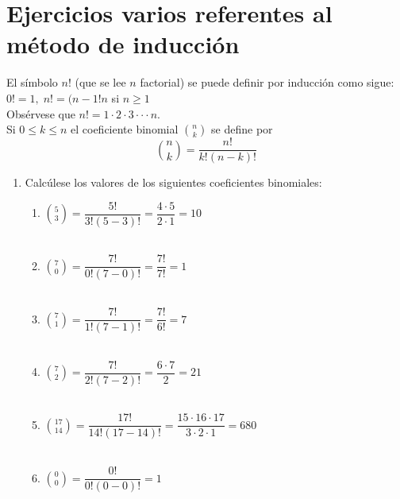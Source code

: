 \section{Ejercicios varios referentes al método de inducción}
\begin{def.}
El símbolo $n!$ (que se lee $n$ factorial) se puede definir por inducción como sigue: $0!=1, \; n!=(n-1!n$ si $n\geq 1$\\
Obsérvese que $n!=1\cdot 2 \cdot 3 \cdot \cdot \cdot n.$\\
Si $0\leq k \leq n$ el coeficiente binomial ${n \choose k}$ se define por 
$${n \choose k} = \dfrac{n!}{k!(n-k)!}$$
\end{def.}
\begin{enumerate}[ \bfseries 1.]

\item Calcúlese los valores de los siguientes coeficientes binomiales:
\begin{enumerate}[\bfseries (a)]
\item ${5 \choose 3} = \dfrac{5!}{3!(5-3)!} = \dfrac{4\cdot 5}{2\cdot 1} = 10$\\\\

\item ${ 7 \choose 0 } = \dfrac{7!}{0!(7-0)!} = \dfrac{7!}{7!} = 1$\\\\

\item ${ 7 \choose 1 } = \dfrac{7!}{1!(7-1)!} = \dfrac{7!}{6!} = 7$\\\\

\item ${ 7 \choose 2 } = \dfrac{7!}{2!(7-2)!} = \dfrac{6\cdot 7}{2} = 21$\\\\

\item ${ 17 \choose 14 } = \dfrac{17!}{14!(17-14)!} = \dfrac{15 \cdot 16 \cdot 17}{3\cdot 2 \cdot 1} = 680$\\\\

\item ${ 0 \choose 0 } = \dfrac{0!}{0!(0-0)!} = 1$\\\\
\end{enumerate}


\end{enumerate}
